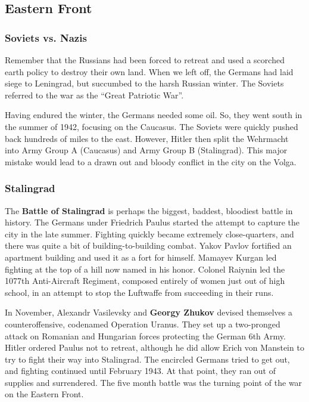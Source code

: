 \subsection*{Eastern Front}

\subsubsection*{Soviets vs. Nazis}

Remember that the Russians had been forced to retreat
and used a scorched earth policy to destroy their own land.
When we left off, the Germans had laid siege to Leningrad,
but succumbed to the harsh Russian winter.
The Soviets referred to the war as the ``Great Patriotic War''.

Having endured the winter, the Germans needed some oil.
So, they went south in the summer of 1942, focusing on the Caucasus.
The Soviets were quickly pushed back hundreds of miles to the east.
However,
Hitler then split the Wehrmacht into Army Group A (Caucasus) and Army Group B (Stalingrad).
This major mistake would lead to a drawn out and bloody conflict in the city on the Volga.

\subsubsection*{Stalingrad}

The \textbf{Battle of Stalingrad} is perhaps the biggest, baddest, bloodiest battle in history.
The Germans under Friedrich Paulus started the attempt to capture the city in the late summer.
Fighting quickly became extremely close-quarters,
and there was quite a bit of building-to-building combat.
Yakov Pavlov fortified an apartment building and used it as a fort for himself.
Mamayev Kurgan led fighting at the top of a hill now named in his honor.
Colonel Raiynin led the 1077th Anti-Aircraft Regiment,
composed entirely of women just out of high school,
in an attempt to stop the Luftwaffe from succeeding in their runs.

In November, Alexandr Vasilevsky and \textbf{Georgy Zhukov} devised themselves a counteroffensive,
codenamed Operation Uranus.
They set up a two-pronged attack on Romanian and Hungarian forces protecting the German 6th Army.
Hitler ordered Paulus not to retreat,
although he did allow Erich von Manstein to try to fight their way into Stalingrad.
The encircled Germans tried to get out, and fighting continued until February 1943.
At that point, they ran out of supplies and surrendered.
The five month battle was the turning point of the war on the Eastern Front.


